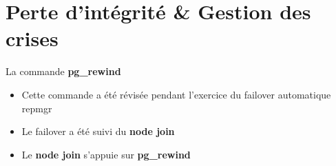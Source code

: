 
\section{Perte d'intégrité & Gestion des crises}


\begin{frame}[fragile]{La commande \textbf{pg\_rewind}}

   \begin{itemize}
      \item Cette commande a été révisée pendant l'exercice du failover automatique repmgr
      \item Le failover a été suivi du \textbf{node join}
      \item Le \textbf{node join} s'appuie sur \textbf{pg\_rewind}
   \end{itemize}

\begin{toile}
\end{toile}

\end{frame}

